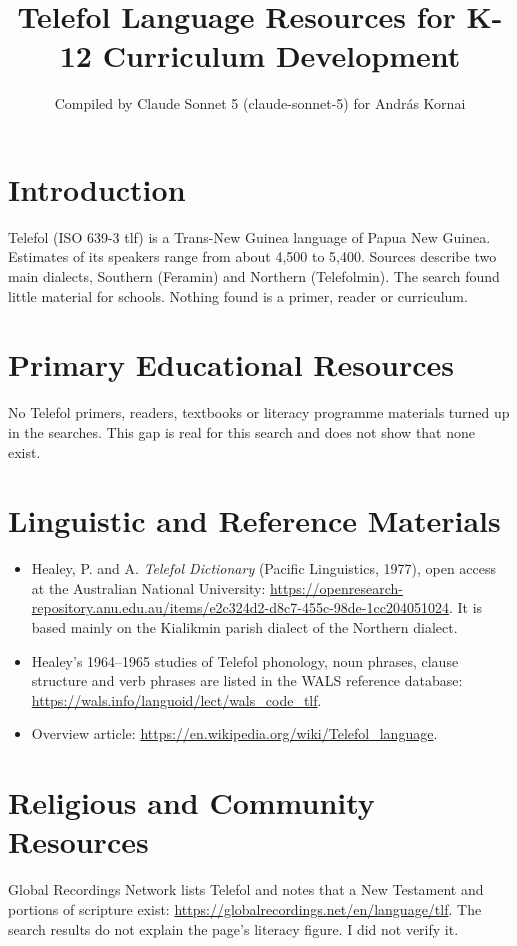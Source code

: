 \documentclass[12pt]{article}
\title{Telefol Language Resources for K-12 Curriculum Development}
\author{Compiled by Claude Sonnet 5 (claude-sonnet-5) for Andr\'as Kornai}
\date{}
\begin{document}
\maketitle

\section{Introduction}
Telefol (ISO 639-3 tlf) is a Trans-New Guinea language of Papua New Guinea. Estimates of its speakers range from about 4,500 to 5,400. Sources describe two main dialects, Southern (Feramin) and Northern (Telefolmin). The search found little material for schools. Nothing found is a primer, reader or curriculum.

\section{Primary Educational Resources}
No Telefol primers, readers, textbooks or literacy programme materials turned up in the searches. This gap is real for this search and does not show that none exist.

\section{Linguistic and Reference Materials}
\begin{itemize}
\item Healey, P. and A. \emph{Telefol Dictionary} (Pacific Linguistics, 1977), open access at the Australian National University: \url{https://openresearch-repository.anu.edu.au/items/e2c324d2-d8c7-455c-98de-1cc204051024}. It is based mainly on the Kialikmin parish dialect of the Northern dialect.
\item Healey's 1964--1965 studies of Telefol phonology, noun phrases, clause structure and verb phrases are listed in the WALS reference database: \url{https://wals.info/languoid/lect/wals_code_tlf}.
\item Overview article: \url{https://en.wikipedia.org/wiki/Telefol_language}.
\end{itemize}

\section{Religious and Community Resources}
Global Recordings Network lists Telefol and notes that a New Testament and portions of scripture exist: \url{https://globalrecordings.net/en/language/tlf}. The search results do not explain the page's literacy figure. I did not verify it.
\end{document}
